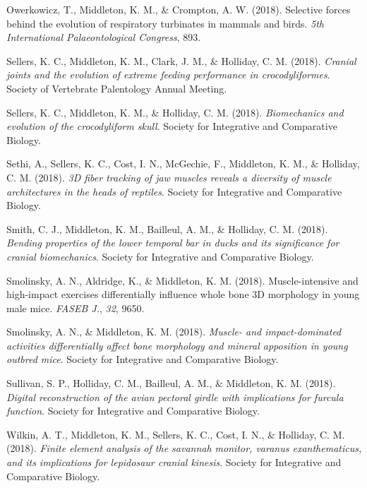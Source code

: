 \documentclass[11pt, a4paper]{awesome-cv}
\begin{document}
\leavevmode\hypertarget{ref-Owerkowicz2018-hr}{}%
Owerkowicz, T., Middleton, K. M., \& Crompton, A. W. (2018). Selective
forces behind the evolution of respiratory turbinates in mammals and
birds. \emph{5th International Palaeontological Congress}, 893.

\leavevmode\hypertarget{ref-Sellers2018-lh}{}%
Sellers, K. C., Middleton, K. M., Clark, J. M., \& Holliday, C. M.
(2018). \emph{Cranial joints and the evolution of extreme feeding
performance in crocodyliformes}. Society of Vertebrate Palentology
Annual Meeting.

\leavevmode\hypertarget{ref-Sellers2018-sc}{}%
Sellers, K. C., Middleton, K. M., \& Holliday, C. M. (2018).
\emph{Biomechanics and evolution of the crocodyliform skull}. Society
for Integrative and Comparative Biology.

\leavevmode\hypertarget{ref-Sethi2018-ga}{}%
Sethi, A., Sellers, K. C., Cost, I. N., McGechie, F., Middleton, K. M.,
\& Holliday, C. M. (2018). \emph{3D fiber tracking of jaw muscles
reveals a diversity of muscle architectures in the heads of reptiles}.
Society for Integrative and Comparative Biology.

\leavevmode\hypertarget{ref-Smith2018-kz}{}%
Smith, C. J., Middleton, K. M., Bailleul, A. M., \& Holliday, C. M.
(2018). \emph{Bending properties of the lower temporal bar in ducks and
its significance for cranial biomechanics}. Society for Integrative and
Comparative Biology.

\leavevmode\hypertarget{ref-Smolinsky2018-iz}{}%
Smolinsky, A. N., Aldridge, K., \& Middleton, K. M. (2018).
Muscle-intensive and high-impact exercises differentially influence
whole bone 3D morphology in young male mice. \emph{FASEB J.}, \emph{32},
9650.

\leavevmode\hypertarget{ref-Smolinsky2018-sy}{}%
Smolinsky, A. N., \& Middleton, K. M. (2018). \emph{Muscle- and
impact-dominated activities differentially affect bone morphology and
mineral apposition in young outbred mice}. Society for Integrative and
Comparative Biology.

\leavevmode\hypertarget{ref-Sullivan2018-kt}{}%
Sullivan, S. P., Holliday, C. M., Bailleul, A. M., \& Middleton, K. M.
(2018). \emph{Digital reconstruction of the avian pectoral girdle with
implications for furcula function}. Society for Integrative and
Comparative Biology.

\leavevmode\hypertarget{ref-Wilkin2018-ya}{}%
Wilkin, A. T., Middleton, K. M., Sellers, K. C., Cost, I. N., \&
Holliday, C. M. (2018). \emph{Finite element analysis of the savannah
monitor, \textup{varanus exanthematicus}, and its implications for
lepidosaur cranial kinesis}. Society for Integrative and Comparative
Biology.
\end{document}

